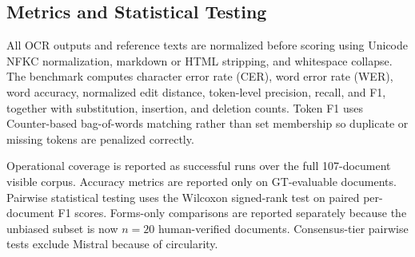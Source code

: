 \documentclass[conference]{IEEEtran}
\begin{document}
\begin{table}[t]
\centering
\caption{Phase~1 model set and run coverage on the 107-document visible corpus. Mean latency is computed over successful visible-corpus runs. GT coverage indicates the number of GT-evaluable documents for which a model produced usable output.}
\label{tab:coverage}
\footnotesize
{}
\end{table}

\subsection{Metrics and Statistical Testing}

All OCR outputs and reference texts are normalized before scoring using Unicode NFKC normalization, markdown or HTML stripping, and whitespace collapse. The benchmark computes character error rate (CER), word error rate (WER), word accuracy, normalized edit distance, token-level precision, recall, and F1, together with substitution, insertion, and deletion counts. Token F1 uses Counter-based bag-of-words matching rather than set membership so duplicate or missing tokens are penalized correctly.

Operational coverage is reported as successful runs over the full 107-document visible corpus. Accuracy metrics are reported only on GT-evaluable documents. Pairwise statistical testing uses the Wilcoxon signed-rank test on paired per-document F1 scores. Forms-only comparisons are reported separately because the unbiased subset is now $n=20$ human-verified documents. Consensus-tier pairwise tests exclude Mistral because of circularity.
\end{document}
